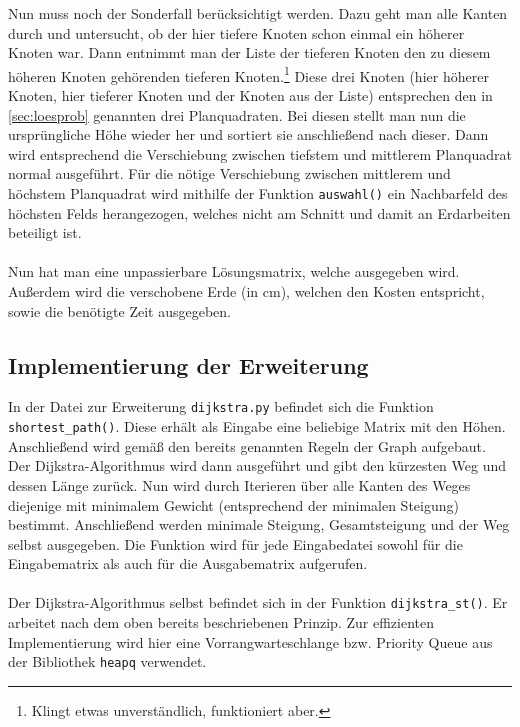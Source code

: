 \documentclass[a4paper, notitlepage, 12pt]{scrartcl}
\begin{document}
Nun muss noch der Sonderfall berücksichtigt werden. Dazu geht man alle Kanten durch und untersucht, ob der hier tiefere Knoten schon einmal ein höherer Knoten war. Dann entnimmt man der Liste der tieferen Knoten den zu diesem höheren Knoten gehörenden tieferen Knoten.\footnote{Klingt etwas unverständlich, funktioniert aber.} Diese drei Knoten (hier höherer Knoten, hier tieferer Knoten und der Knoten aus der Liste) entsprechen den in \autoref{sec:loesprob} genannten drei Planquadraten. Bei diesen stellt man nun die ursprüngliche Höhe wieder her und sortiert sie anschließend nach dieser. Dann wird entsprechend die Verschiebung zwischen tiefstem und mittlerem Planquadrat normal ausgeführt. Für die nötige Verschiebung zwischen mittlerem und höchstem Planquadrat wird mithilfe der Funktion \texttt{auswahl()} ein Nachbarfeld des höchsten Felds herangezogen, welches nicht am Schnitt und damit an Erdarbeiten beteiligt ist. \\ \\
Nun hat man eine unpassierbare Lösungsmatrix, welche ausgegeben wird. Außerdem wird die verschobene Erde (in cm), welchen den Kosten entspricht, sowie die benötigte Zeit ausgegeben.
\subsection{Implementierung der Erweiterung}
In der Datei zur Erweiterung \texttt{dijkstra.py} befindet sich die Funktion \texttt{shortest\_path()}. Diese erhält als Eingabe eine beliebige Matrix mit den Höhen. Anschließend wird gemäß den bereits genannten Regeln der Graph aufgebaut. Der Dijkstra-Algorithmus wird dann ausgeführt und gibt den kürzesten Weg und dessen Länge zurück. Nun wird durch Iterieren über alle Kanten des Weges diejenige mit minimalem Gewicht (entsprechend der minimalen Steigung) bestimmt. Anschließend werden minimale Steigung, Gesamtsteigung und der Weg selbst ausgegeben. Die Funktion wird für jede Eingabedatei sowohl für die Eingabematrix als auch für die Ausgabematrix aufgerufen. \\ \\
Der Dijkstra-Algorithmus selbst befindet sich in der Funktion \texttt{dijkstra\_st()}. Er arbeitet nach dem oben bereits beschriebenen Prinzip. Zur effizienten Implementierung wird hier eine Vorrangwarteschlange bzw. Priority Queue aus der Bibliothek \texttt{heapq} verwendet.
\end{document}
